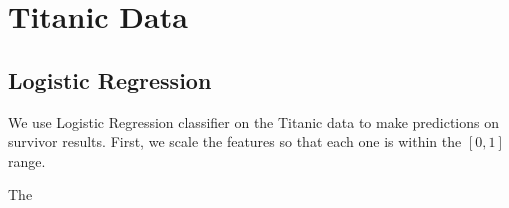 
\section{Titanic Data}\label{sec:tinanic}

\subsection{Logistic Regression}
We use Logistic Regression classifier on the Titanic data to make predictions on survivor results. First, we scale the features so that each one is within the $[0, 1]$ range. 

The 

